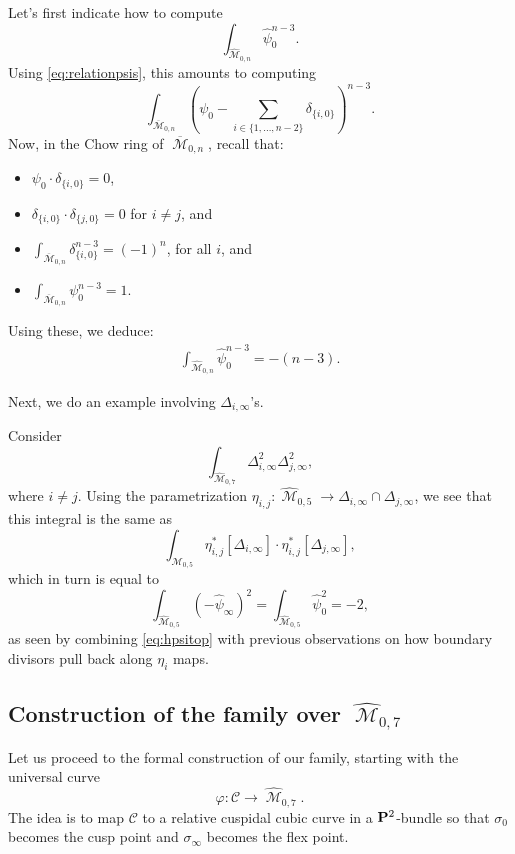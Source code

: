 \documentclass[12pt,reqno]{amsart}
\DeclareMathOperator{\M}{\mathcal{M}}
\renewcommand{\to}{{\longrightarrow}}
\numberwithin{equation}{section}
\newcommand{\cC}{\mathcal{C}}
\newcommand{\hpsi}{\widehat{\psi}}
\newcommand{\hM}{\widehat{\M}}
\renewcommand {\o}[1]{\overline{#1}}
\begin{document}
\begin{example}
  \label{ex:toppsi}
  Let's first indicate how to
  compute $$\int_{\hM_{0,n}}\hpsi_{0}^{n-3}.$$ Using
  \eqref{eq:relationpsis}, this amounts to computing
  $$\int_{\o{\M}_{0,n}} \left(\psi_{0} - \sum_{i \in \{1, \dots, n-2\}} \delta_{\{i,0\}}\right)^{n-3}.$$
  Now, in the Chow ring of $\o{\M}_{0,n}$, recall that:
  \begin{itemize}
  \item $\psi_{0} \cdot \delta_{\{i,0\}} = 0$, 
  \item $\delta_{\{i,0\}} \cdot \delta_{\{j,0\}} = 0$ for $i \neq j$,
    and
  \item $\int_{\o{\M}_{0,n}}\delta_{\{i,0\}}^{n-3} = (-1)^{n}$, for
    all $i$, and
  \item $\int_{\o{\M}_{0,n}} \psi_{0}^{n-3} = 1$.
  \end{itemize}

  Using these, we deduce:
  \begin{align}
    \label{eq:hpsitop}
    \int_{\hM_{0,n}}\hpsi_{0}^{n-3} = -(n-3). 
  \end{align}
\end{example}

Next, we do an example involving $\Delta_{i, \infty}$'s.

\begin{example}
  Consider
  $$\int_{\hM_{0,7}} \Delta_{i, \infty}^{2}\Delta_{j, \infty}^{2},$$
  where $i \neq j$.  Using the parametrization
  $\eta_{i,j} : \hM_{0,5} \to \Delta_{i,\infty} \cap
  \Delta_{j,\infty}$, we see that this integral is the same as
  $$\int_{\hM_{0,5}}\eta_{i,j}^{*}[\Delta_{i, \infty}] \cdot \eta_{i,j}^{*}[\Delta_{j, \infty}],$$
  which in turn is equal to
  $$\int_{\hM_{0,5}}(-\hpsi_{\infty})^{2} = \int_{\hM_{0,5}}\hpsi_{0}^{2} = -2,$$
  as seen by combining \eqref{eq:hpsitop} with previous observations
  on how boundary divisors pull back along $\eta_{i}$ maps.
\end{example}

\subsection{Construction of the family over $\hM_{0,7}$}
\label{sec:constr-family-hM07}

Let us proceed to the formal construction of our family, starting with
the universal curve
$$\varphi: \cC \to \hM_{0,7}.$$
The idea is to map $\cC$ to a relative cuspidal cubic curve in a
$\P^{2}$-bundle so that $\sigma_{0}$ becomes the cusp point and
$\sigma_{\infty}$ becomes the flex point.
\end{document}
